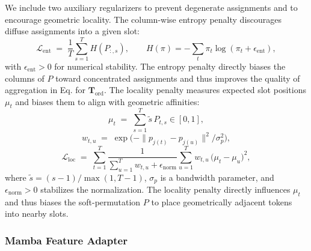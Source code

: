 We include two auxiliary regularizers to prevent degenerate assignments and to encourage geometric locality. The column-wise entropy penalty discourages diffuse assignments into a given slot:
\begin{equation}
\mathcal{L}_{\mathrm{ent}} \;=\; \frac{1}{T}\sum_{s=1}^T H(P_{:,s}),\qquad
H(\pi)=-\sum_{t}\pi_t\log(\pi_t+\epsilon_{\mathrm{ent}}),
\end{equation}
with \(\epsilon_{\mathrm{ent}}>0\) for numerical stability. The entropy penalty directly biases the columns of \(P\) toward concentrated assignments and thus improves the quality of aggregation in Eq. for \(\mathbf{T}_{\mathrm{ord}}\). The locality penalty measures expected slot positions \(\mu_t\) and biases them to align with geometric affinities:
\begin{equation}
\mu_t \;=\; \sum_{s=1}^T \tilde s\,P_{t,s}\in[0,1],
\end{equation}
\begin{equation}
w_{t,u} \;=\; \exp\!\big(-\|p_{j(t)}-p_{j(u)}\|^2/\sigma_p^2\big),
\end{equation}
\begin{equation}
\mathcal{L}_{\mathrm{loc}} \;=\; \sum_{t=1}^T \frac{1}{\sum_{u=1}^T w_{t,u} + \epsilon_{\mathrm{norm}}}\sum_{u=1}^T w_{t,u}\,\big(\mu_t - \mu_u\big)^2,
\end{equation}
where \(\tilde s=(s-1)/\max(1,T-1)\), \(\sigma_p\) is a bandwidth parameter, and \(\epsilon_{\mathrm{norm}}>0\) stabilizes the normalization. The locality penalty directly influences \(\mu_t\) and thus biases the soft-permutation \(P\) to place geometrically adjacent tokens into nearby slots.

\subsubsection{Mamba Feature Adapter}

